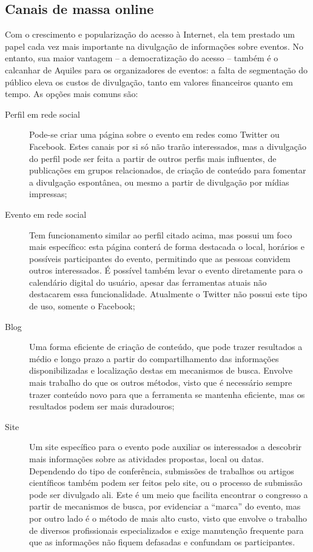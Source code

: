 \documentclass[12pt,a4paper,twoside,hyphens,english,brazil]{abntex2}
\begin{document}
\subsection*{Canais de massa online}
Com o crescimento e popularização do acesso à Internet, ela tem prestado um papel cada vez mais importante na divulgação de informações sobre eventos. No entanto, sua maior vantagem -- a democratização do acesso -- também é o calcanhar de Aquiles para os organizadores de eventos: a falta de segmentação do público eleva os custos de divulgação, tanto em valores financeiros quanto em tempo. As opções mais comuns são:
\begin{description}
	\item[Perfil em rede social] Pode-se criar uma página sobre o evento em redes como Twitter ou Facebook. Estes canais por si só não trarão interessados, mas a divulgação do perfil pode ser feita a partir de outros perfis mais influentes, de publicações em grupos relacionados, de criação de conteúdo para fomentar a divulgação espontânea, ou mesmo a partir de divulgação por mídias impressas;
	\item[Evento em rede social] Tem funcionamento similar ao perfil citado acima, mas possui um foco mais específico: esta página conterá de forma destacada o local, horários e possíveis participantes do evento, permitindo que as pessoas convidem outros interessados. É possível também levar o evento diretamente para o calendário digital do usuário, apesar das ferramentas atuais não destacarem essa funcionalidade. Atualmente o Twitter não possui este tipo de uso, somente o Facebook;
	\item[Blog] Uma forma eficiente de criação de conteúdo, que pode trazer resultados a médio e longo prazo a partir do compartilhamento das informações disponibilizadas e localização destas em mecanismos de busca. Envolve mais trabalho do que os outros métodos, visto que é necessário sempre trazer conteúdo novo para que a ferramenta se mantenha eficiente, mas os resultados podem ser mais duradouros;
	\item[Site] Um site específico para o evento pode auxiliar os interessados a descobrir mais informações sobre as atividades propostas, local ou datas. Dependendo do tipo de conferência, submissões de trabalhos ou artigos científicos também podem ser feitos pelo site, ou o processo de submissão pode ser divulgado ali. Este é um meio que facilita encontrar o congresso a partir de mecanismos de busca, por evidenciar a ``marca'' do evento, mas por outro lado é o método de mais alto custo, visto que envolve o trabalho de diversos profissionais especializados e exige manutenção frequente para que as informações não fiquem defasadas e confundam os participantes.
\end{description}
\end{document}
